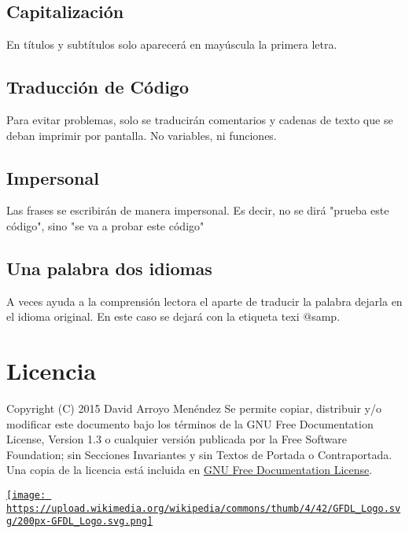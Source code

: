 \documentclass[11pt]{article}
\begin{document}
\subsection{Capitalización}
\label{sec-5-1}
En títulos y subtítulos solo aparecerá en mayúscula la primera letra.
\subsection{Traducción de Código}
\label{sec-5-2}
Para evitar problemas, solo se traducirán comentarios y cadenas de
texto que se deban imprimir por pantalla. No variables, ni funciones.
\subsection{Impersonal}
\label{sec-5-3}
Las frases se escribirán de manera impersonal. Es decir, no se dirá
"prueba este código", sino "se va a probar este código"
\subsection{Una palabra dos idiomas}
\label{sec-5-4}
A veces ayuda a la comprensión lectora el aparte de traducir la
palabra dejarla en el idioma original. En este caso se dejará con la
etiqueta texi @samp.

\section{Licencia}
\label{sec-6}
Copyright (C) 2015  David Arroyo Menéndez
    Se permite copiar, distribuir y/o modificar este documento
    bajo los términos de la GNU Free Documentation License, Version 1.3
    o cualquier versión publicada por la Free Software Foundation;
    sin Secciones Invariantes y sin Textos de Portada o Contraportada.
    Una copia de la licencia está incluida en \href{https://www.gnu.org/copyleft/fdl.html}{GNU Free Documentation License}.

\href{https://www.gnu.org/copyleft/fdl.html}{\texttt{[image: https://upload.wikimedia.org/wikipedia/commons/thumb/4/42/GFDL\_Logo.svg/200px-GFDL\_Logo.svg.png]}}
\end{document}
